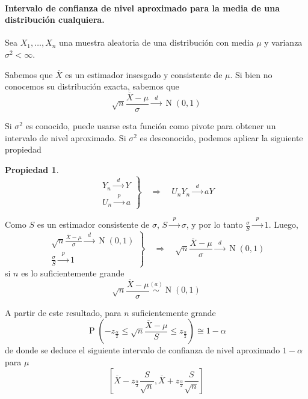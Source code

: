 \documentclass[11pt]{article}
\theoremstyle{plain}
\theoremstyle{definition}
\newtheorem*{prop}{Propiedad}
\theoremstyle{remark}
\newcommand{\proba}{\ensuremath{\operatorname{P}}}  %
\newcommand{\dists}[1]{\ensuremath{\operatorname{#1}}}  %
\newcommand{\distt}[2]{\ensuremath{\overset{#1}{\sim} \operatorname{#2}}}  %
\newcommand{\tiende}[1]{\ensuremath{\xrightarrow{\;\; #1 \;\;}}}  %
\begin{document}
      \paragraph{Intervalo de confianza de nivel aproximado para la media de una distribución cualquiera.}

        Sea $X_1, \dots, X_n$ una muestra aleatoria de una distribución con media $\mu$ y varianza $\sigma^2 < \infty$.

        Sabemos que $\overline{X}$ es un estimador insesgado y consistente de $\mu$. Si bien no conocemos su distribución exacta, sabemos que
        \[ \sqrt{n} \frac{\overline{X} - \mu}{\sigma} \tiende{d} \dists{N}(0,1) \]

        Si $\sigma^2$ es conocido, puede usarse esta función como pivote para obtener un intervalo de nivel aproximado. Si $\sigma^2$ es desconocido, podemos aplicar la siguiente propiedad 

        \begin{prop}
          \[ \left. \begin{array}{l} Y_n \tiende{d} Y \\ U_n \tiende{p} a \end{array} \right\rbrace \quad \Longrightarrow \quad U_n Y_n \tiende{d} a Y \]
        \end{prop}

        Como $S$ es un estimador consistente de $\sigma$, $S \tiende{p} \sigma$, y por lo tanto $\frac{\sigma}{S} \tiende{p} 1$. Luego,
        \[ \left. \begin{array}{l}
        \displaystyle \sqrt{n} \frac{\overline{X} - \mu}{\sigma} \tiende{d} \dists{N}(0,1) \\
        \displaystyle \frac{\sigma}{S} \tiende{p} 1
        \end{array} \right\rbrace \quad \Longrightarrow \quad \sqrt{n} \frac{\overline{X} - \mu}{\sigma} \tiende{d} \dists{N}(0,1) \]
        si $n$ es lo suficientemente grande
        \[ \sqrt{n} \frac{\overline{X} - \mu}{\sigma} \distt{(a)}{N}(0,1) \]

        A partir de este resultado, para $n$ suficientemente grande
        \[ \proba \left( -z_{\frac{\alpha}{2}} \leq \sqrt{n} \frac{\overline{X} - \mu}{S} \leq z_{\frac{\alpha}{2}} \right) \cong 1 - \alpha \]
        de donde se deduce el siguiente intervalo de confianza de nivel aproximado $1 - \alpha$ para $\mu$
        \[ \left[ \overline{X} - z_{\frac{\alpha}{2}} \frac{S}{\sqrt{n}}, \overline{X} + z_{\frac{\alpha}{2}} \frac{S}{\sqrt{n}} \right] \]
\end{document}
